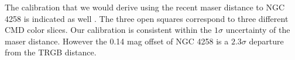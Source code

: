\documentclass[11pt,preprint2]{aastex}
\begin{document}
The calibration that we would derive using the recent maser distance to NGC 4258 is indicated as well \citep{2005ASPC..340..466H}. The three open squares correspond to three different CMD color slices. Our calibration is consistent within the $1 \sigma$ uncertainty of the maser distance. However the 0.14 mag offset of NGC 4258 is a $2.3 \sigma$ departure from the TRGB distance.











\end{document}
